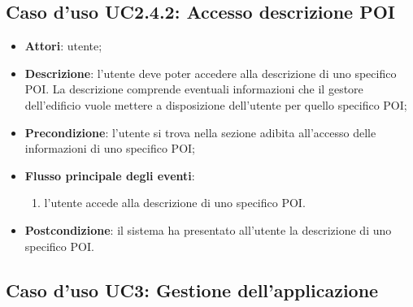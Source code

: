 \documentclass[../AnalisiDeiRequisiti.tex]{subfiles}
\begin{document}
\subsection{Caso d'uso UC2.4.2: Accesso descrizione POI}
\begin{itemize}
	\item \textbf{Attori}: utente;
	\item \textbf{Descrizione}: l'utente deve poter accedere alla descrizione di uno specifico POI. La descrizione comprende eventuali informazioni che il gestore dell'edificio vuole mettere a disposizione dell'utente per quello specifico POI; 
	\item \textbf{Precondizione}: l'utente si trova nella sezione adibita all'accesso delle informazioni di uno specifico POI;
	
	\item \textbf{Flusso principale degli eventi}:
	\begin{enumerate}
		\item l'utente accede alla descrizione di uno specifico POI.
		
	\end{enumerate}
	\item \textbf{Postcondizione}: il sistema ha presentato all'utente la descrizione di uno specifico POI.
\end{itemize}
\hypertarget{UC3}{}
\subsection{Caso d'uso UC3: Gestione dell'applicazione}
\end{document}
